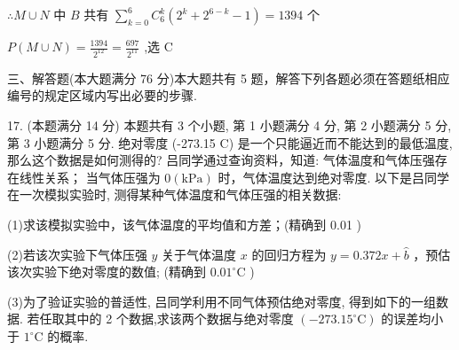\documentclass[10pt]{article}
\newcommand*\circled[1]{\tikz[baseline=(char.base)]{\node[shape=circle,draw,inner sep=1.5pt] (char) {\small #1};}}
\begin{document}
\(\therefore M \cup  N\) 中 \(B\) 共有 \(\mathop{\sum }\limits_{{k = 0}}^{6}{C}_{6}^{k}\left( {{2}^{k} + {2}^{6 - k} - 1}\right)  = {1394}\) 个

\(P\left( {M \cup  N}\right)  = \frac{1394}{{2}^{12}} = \frac{697}{{2}^{11}}\) ,选 C

三、解答题(本大题满分 76 分)本大题共有 5 题，解答下列各题必须在答题纸相应编号的规定区域内写出必要的步骤.

17. (本题满分 14 分) 本题共有 3 个小题, 第 1 小题满分 4 分, 第 2 小题满分 5 分, 第 3 小题满分 5 分. 绝对零度 (-273.15 \textdegree C) 是一个只能逼近而不能达到的最低温度, 那么这个数据是如何测得的? 吕同学通过查询资料，知道: \circled{1} 气体温度和气体压强存在线性关系； \circled{2} 当气体压强为 \(0\left( \mathrm{{kPa}}\right)\) 时，气体温度达到绝对零度. 以下是吕同学在一次模拟实验时, 测得某种气体温度和气体压强的相关数据:

\begin{center}
\end{center}

(1)求该模拟实验中，该气体温度的平均值和方差；(精确到 0.01 )

(2)若该次实验下气体压强 \(y\) 关于气体温度 \(x\) 的回归方程为 \(y = {0.372x} + \widehat{b}\) ，预估该次实验下绝对零度的数值; (精确到 \({0.01}^{ \circ  }\mathrm{C}\) )

(3)为了验证实验的普适性, 吕同学利用不同气体预估绝对零度, 得到如下的一组数据. 若任取其中的 2 个数据,求该两个数据与绝对零度 \(\left( {-{273.15}^{ \circ  }\mathrm{C}}\right)\) 的误差均小于 \({1}^{ \circ  }\mathrm{C}\) 的概率.

\begin{center}
\end{center}
\end{document}
